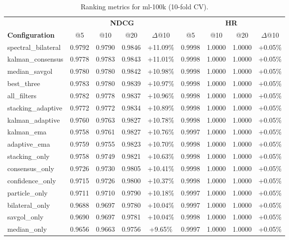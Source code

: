 \begin{table}[htbp]
\centering
\caption{Ranking metrics for ml-100k (10-fold CV).}
\label{tab:ranking-ml-100k}
\begin{adjustbox}{max width=\textwidth}
\begin{tabular}{l cccc cccc}
\toprule
& \multicolumn{4}{c}{\textbf{NDCG}} & \multicolumn{4}{c}{\textbf{HR}} \\
\cmidrule(lr){2-5} \cmidrule(lr){6-9}
\textbf{Configuration} & @5 & @10 & @20 & $\Delta$@10 & @5 & @10 & @20 & $\Delta$@10 \\
\midrule
spectral\_bilateral & 0.9792 & 0.9790 & 0.9846 & +11.09\% & 0.9998 & 1.0000 & 1.0000 & +0.05\% \\
kalman\_consensus & 0.9778 & 0.9783 & 0.9843 & +11.01\% & 0.9998 & 1.0000 & 1.0000 & +0.05\% \\
median\_savgol & 0.9780 & 0.9780 & 0.9842 & +10.98\% & 0.9998 & 1.0000 & 1.0000 & +0.05\% \\
best\_three & 0.9783 & 0.9780 & 0.9839 & +10.97\% & 0.9998 & 1.0000 & 1.0000 & +0.05\% \\
all\_filters & 0.9782 & 0.9778 & 0.9837 & +10.96\% & 0.9998 & 1.0000 & 1.0000 & +0.05\% \\
stacking\_adaptive & 0.9772 & 0.9772 & 0.9834 & +10.89\% & 0.9998 & 1.0000 & 1.0000 & +0.05\% \\
kalman\_adaptive & 0.9760 & 0.9763 & 0.9827 & +10.78\% & 0.9998 & 1.0000 & 1.0000 & +0.05\% \\
kalman\_ema & 0.9758 & 0.9761 & 0.9827 & +10.76\% & 0.9997 & 1.0000 & 1.0000 & +0.05\% \\
adaptive\_ema & 0.9759 & 0.9755 & 0.9823 & +10.70\% & 0.9998 & 1.0000 & 1.0000 & +0.05\% \\
stacking\_only & 0.9758 & 0.9749 & 0.9821 & +10.63\% & 0.9998 & 1.0000 & 1.0000 & +0.05\% \\
consensus\_only & 0.9726 & 0.9730 & 0.9805 & +10.41\% & 0.9998 & 1.0000 & 1.0000 & +0.05\% \\
confidence\_only & 0.9715 & 0.9726 & 0.9800 & +10.37\% & 0.9998 & 1.0000 & 1.0000 & +0.05\% \\
particle\_only & 0.9711 & 0.9710 & 0.9790 & +10.18\% & 0.9997 & 1.0000 & 1.0000 & +0.05\% \\
bilateral\_only & 0.9688 & 0.9697 & 0.9780 & +10.04\% & 0.9997 & 1.0000 & 1.0000 & +0.05\% \\
savgol\_only & 0.9690 & 0.9697 & 0.9781 & +10.04\% & 0.9998 & 1.0000 & 1.0000 & +0.05\% \\
median\_only & 0.9656 & 0.9663 & 0.9756 & +9.65\% & 0.9997 & 1.0000 & 1.0000 & +0.05\% \\

\end{tabular}
\end{adjustbox}
\end{table}
